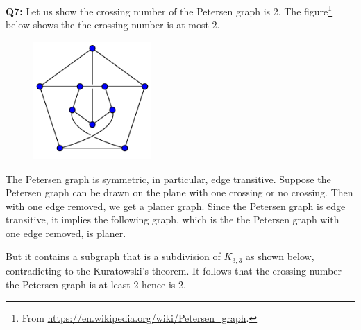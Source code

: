 \documentclass[12pt,reqno]{amsart}
\theoremstyle{definition}
\begin{document}
\newpage
\noindent \textbf{Q7:} Let us show the crossing number of the Petersen graph is 2. The figure\footnote{From \url{https://en.wikipedia.org/wiki/Petersen_graph}.} below shows the the crossing number is at most $2$.

\begin{figure}[h]
  \centering
  \includegraphics[width=4.5cm]{hw4c}
\end{figure}

The Petersen graph is symmetric, in particular, edge transitive. Suppose the Petersen graph can be drawn on the plane with one crossing or no crossing. Then with one edge removed, we get a planer graph. Since the Petersen graph is edge transitive, it implies the following graph, which is the the Petersen graph with one edge removed, is planer.

\begin{center}
\end{center}

But it contains a subgraph that is a subdivision of $K_{3,3}$ as shown below, contradicting to the Kuratowski's theorem. It follows that the crossing number the Petersen graph is at least 2 hence is 2.
\end{document}
